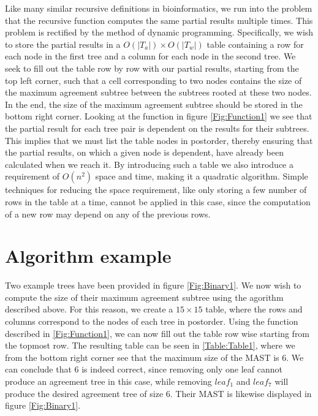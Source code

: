Like many similar recursive definitions in bioinformatics, we run into the problem that the recursive function computes the same partial results multiple times. This problem is rectified by the method of dynamic programming. Specifically, we wish to store the partial results in a $O(|T_a|) \times O(|T_w|)$ table containing a row for each node in the first tree and a column for each node in the second tree. We seek to fill out the table row by row with our partial results, starting from the top left corner, such that a cell corresponding to two nodes contains the size of the maximum agreement subtree between the subtrees rooted at these two nodes. In the end, the size of the maximum agreement subtree should be stored in the bottom right corner.
Looking at the function in figure \ref{Fig:Function1} we see that the partial result for each tree pair is dependent on the results for their subtrees. This implies that we must list the table nodes in postorder, thereby ensuring that the partial results, on which a given node is dependent, have already been calculated when we reach it. 
By introducing such a table we also introduce a requirement of $O(n^2)$ space and time, making it a quadratic algorithm. Simple techniques for reducing the space requirement, like only storing a few number of rows in the table at a time, cannot be applied in this case, since the computation of a new row may depend on any of the previous rows.  

\section{Algorithm example}
Two example trees have been provided in figure \ref{Fig:Binary1}. We now wish to compute the size of their maximum agreement subtree using the agorithm described above. For this reason, we create a $15 \times 15$ table, where the rows and columns correspond to the nodes of each tree in postorder. Using the function described in \ref{Fig:Function1}, we can now fill out the table row wise starting from the topmost row. The resulting table can be seen in \ref{Table:Table1}, where we from the bottom right corner see that the maximum size of the MAST is 6. We can conclude that 6 is indeed correct, since removing only one leaf cannot produce an agreement tree in this case, while removing $leaf_1$ and $leaf_7$ will produce the desired agreement tree of size 6. Their MAST is likewise displayed in figure \ref{Fig:Binary1}. 

